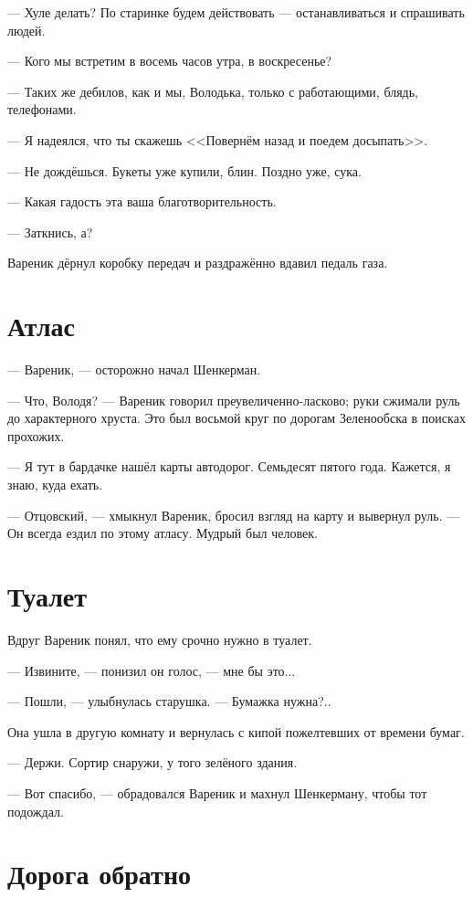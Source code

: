 \documentclass[a4paper,10pt,fleqn]{book}\usepackage{polyglossia}\setdefaultlanguage{english}\setotherlanguage{russian}\defaultfontfeatures{Ligatures=TeX,Mapping=tex-text} \usepackage{xcolor}\definecolor{lightgray}{HTML}{bbbbbb}\color{lightgray}\newcommand{\ml}[3]{\textcolor{black}{#3}}
\begin{document}
--- Хуле делать?
По старинке будем действовать --- останавливаться и спрашивать людей.

--- Кого мы встретим в восемь часов утра, в воскресенье?

--- Таких же дебилов, как и мы, Володька, только с работающими, блядь, телефонами.

--- Я надеялся, что ты скажешь <<Повернём назад и поедем досыпать>>.

--- Не дождёшься.
Букеты уже купили, блин.
Поздно уже, сука.

--- Какая гадость эта ваша благотворительность.

--- Заткнись, а?

Вареник дёрнул коробку передач и раздражённо вдавил педаль газа.

\section{Атлас}

--- Вареник, --- осторожно начал Шенкерман.

--- Что, Володя? --- Вареник говорил преувеличенно-ласково;
руки сжимали руль до характерного хруста.
Это был восьмой круг по дорогам Зеленообска в поисках прохожих.

--- Я тут в бардачке нашёл карты автодорог.
Семьдесят пятого года.
Кажется, я знаю, куда ехать.

--- Отцовский, --- хмыкнул Вареник, бросил взгляд на карту и вывернул руль.
--- Он всегда ездил по этому атласу.
Мудрый был человек.

\section{Туалет}

Вдруг Вареник понял, что ему срочно нужно в туалет.

--- Извините, --- понизил он голос, --- мне бы это...

--- Пошли, --- улыбнулась старушка.
--- Бумажка нужна?..

Она ушла в другую комнату и вернулась с кипой пожелтевших от времени бумаг.

--- Держи.
Сортир снаружи, у того зелёного здания.

--- Вот спасибо, --- обрадовался Вареник и махнул Шенкерману, чтобы тот подождал.

\section{Дорога обратно}
\end{document}
